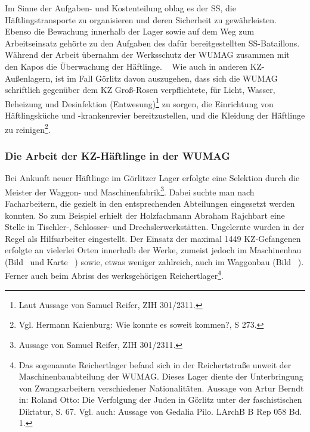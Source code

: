 \documentclass[a4paper,12pt,ngerman,
]{nisebook}
\begin{document}
Im Sinne der Aufgaben- und Kostenteilung oblag es der SS, die Häftlingstransporte zu organisieren und deren Sicherheit zu gewährleisten. Ebenso die Bewachung innerhalb der Lager sowie auf dem Weg zum Arbeitseinsatz gehörte zu den Aufgaben des dafür bereitgestellten SS-Bataillons. Während der Arbeit übernahm der Werksschutz der WUMAG zusammen mit den Kapos die Überwachung der Häftlinge.
~\newline
Wie auch in anderen KZ-Außenlagern, ist im Fall Görlitz davon auszugehen, dass sich die WUMAG schriftlich gegenüber dem KZ Groß-Rosen verpflichtete, für Licht, Wasser, Beheizung und Desinfektion (\glqq Entwesung\grqq)\footnote{Laut Aussage von Samuel Reifer, ZIH 301/2311.} zu sorgen, die Einrichtung von Häftlingsküche und -krankenrevier bereitzustellen, und die Kleidung der Häftlinge zu reinigen\footnote{Vgl. Hermann Kaienburg: Wie konnte es soweit kommen?, S 273.}.





\subsubsection{Die Arbeit der KZ-Häftlinge in der WUMAG}
Bei Ankunft neuer Häftlinge im Görlitzer Lager erfolgte eine Selektion durch die Meister der Waggon- und Maschinenfabrik\footnote{Aussage von Samuel Reifer, ZIH 301/2311.}. Dabei suchte man nach Facharbeitern, die gezielt in den entsprechenden Abteilungen eingesetzt werden konnten. So zum Beispiel erhielt der Holzfachmann Abraham Rajchbart eine Stelle in Tischler-, Schlosser- und Drechslerwerkstätten. Ungelernte wurden in der Regel als Hilfsarbeiter eingestellt.
\newline
Der Einsatz der maximal 1449 KZ-Gefangenen erfolgte an vielerlei Orten innerhalb der Werke, zumeist jedoch im Maschinenbau (Bild~ und Karte~ ) sowie, etwas weniger zahlreich, auch im Waggonbau (Bild ~). Ferner auch beim Abriss des werksgehörigen \glqq Reichertlager\grqq\footnote{Das sogenannte Reichertlager befand sich in der Reichertstraße unweit der Maschinenbauabteilung der WUMAG. Dieses Lager diente der Unterbringung von Zwangsarbeitern verschiedener Nationalitäten. Aussage von Artur Berndt in: Roland Otto: Die Verfolgung der Juden in Görlitz unter der faschistischen Diktatur, S. 67. Vgl. auch: Aussage von Gedalia Pilo. LArchB B Rep 058 Bd. 1.}.
\end{document}
